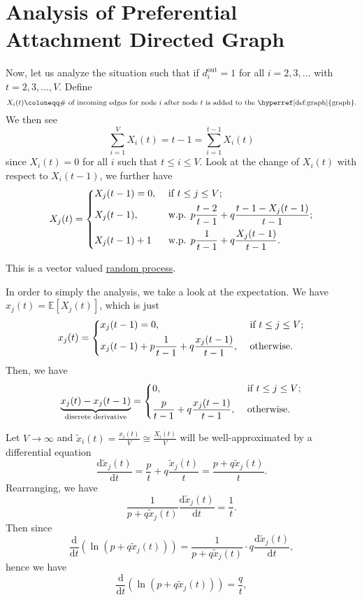 \section{Analysis of Preferential Attachment Directed Graph}
Now, let us analyze the situation such that if \(d_{i}^{\text{out}} = 1\) for all \(i = 2, 3, \dots \) with \(t = 2, 3, \dots , V\). Define
\[
	X_i(t)\coloneqq \#\text{ of incoming edges for node \(i\) after node \(t\) is added to the \hyperref[def:graph]{graph}}.
\]
We then see
\[
	\sum\limits_{i=1}^{V} X_i(t) = t - 1 = \sum\limits_{i=1}^{t - 1} X_{i}(t)
\]
since \(X_i(t) = 0\) for all \(i\) such that \(t\leq i\leq V\). Look at the change of \(X_{i}(t)\) with respect to \(X_i(t - 1)\), we further have
\[
	X_{j}(t) = \begin{dcases}
		X_{j}(t - 1) = 0, & \text{ if }t\leq j\leq V;                                                 \\
		X_{j}(t - 1),     & \text{ w.p. } p \frac{t - 2}{t - 1}+q \frac{t - 1 - X_{j}(t - 1)}{t - 1}; \\
		X_{j}(t - 1)+1    & \text{ w.p. } p \frac{1}{t - 1} + q \frac{X_{j}(t - 1)}{t - 1}.           \\
	\end{dcases}
\]

\begin{remark}
	This is a vector valued \hyperref[def:stochastic-process]{random process}.
\end{remark}

In order to simply the analysis, we take a look at the expectation. We have \(x_{j}(t) = \mathbb{E}\left[X_{j}(t) \right] \), which is just
\[
	x_{j}(t) = \begin{dcases}
		x_{j}(t - 1) = 0,                                                & \text{ if }t\leq j\leq V; \\
		x_{j}(t - 1) + p \frac{1}{t - 1} + q \frac{x_{j}(t - 1)}{t - 1}, & \text{ otherwise}.
	\end{dcases}
\]
Then, we have
\[
	\underbrace{x_{j}(t) - x_{j}(t - 1)}_{\text{discrete derivative}} = \begin{dcases}
		0,                                              & \text{ if }t\leq j\leq V; \\
		\frac{p}{t - 1} + q \frac{x_{j}(t - 1)}{t - 1}, & \text{ otherwise}.
	\end{dcases}
\]

Let \(V\to \infty \) and \(\widetilde{x}_i(t) = \frac{x_{i}(t)}{V}\cong \frac{X_{i}(t)}{V}\) will be well-approximated by a differential equation
\[
	\frac{\mathrm{d}\widetilde{x}_j(t)}{\mathrm{d}t} = \frac{p}{t} + q \frac{\widetilde{x}_j(t)}{t} = \frac{p + q \widetilde{x}_j(t)}{t}.
\]
Rearranging, we have
\[
	\frac{1}{p+q \widetilde{x}_j(t)}\frac{\mathrm{d}\widetilde{x}_j(t)}{\mathrm{d}t} = \frac{1}{t}.
\]
Then since
\[
	\frac{\mathrm{d}}{\mathrm{d}t}\left(\ln(p + q \widetilde{x}_j(t))\right) = \frac{1}{p + q \widetilde{x}_j(t)}\cdot q \frac{\mathrm{d}\widetilde{x}_j(t)}{\mathrm{d}t},
\]
hence we have
\[
	\frac{\mathrm{d}}{\mathrm{d}t}\left(\ln(p + q \widetilde{x}_j(t))\right) = \frac{q}{t},
\]

